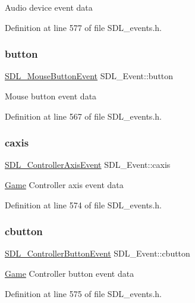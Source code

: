 Audio device event data 

Definition at line 577 of file S\+D\+L\+\_\+events.\+h.

\mbox{\label{union_s_d_l___event_ab6da2fa2687e5f849f270adecc64785f}} 
\subsubsection{\texorpdfstring{button}{button}}
{\footnotesize\ttfamily \mbox{\hyperlink{struct_s_d_l___mouse_button_event}{S\+D\+L\+\_\+\+Mouse\+Button\+Event}} S\+D\+L\+\_\+\+Event\+::button}

Mouse button event data 

Definition at line 567 of file S\+D\+L\+\_\+events.\+h.

\mbox{\label{union_s_d_l___event_aa8f6df0f2716fae56204b12ab4a4c289}} 
\subsubsection{\texorpdfstring{caxis}{caxis}}
{\footnotesize\ttfamily \mbox{\hyperlink{struct_s_d_l___controller_axis_event}{S\+D\+L\+\_\+\+Controller\+Axis\+Event}} S\+D\+L\+\_\+\+Event\+::caxis}

\mbox{\hyperlink{class_game}{Game}} Controller axis event data 

Definition at line 574 of file S\+D\+L\+\_\+events.\+h.

\mbox{\label{union_s_d_l___event_aee2b5671c8dcdb447023715cc21593cb}} 
\subsubsection{\texorpdfstring{cbutton}{cbutton}}
{\footnotesize\ttfamily \mbox{\hyperlink{struct_s_d_l___controller_button_event}{S\+D\+L\+\_\+\+Controller\+Button\+Event}} S\+D\+L\+\_\+\+Event\+::cbutton}

\mbox{\hyperlink{class_game}{Game}} Controller button event data 

Definition at line 575 of file S\+D\+L\+\_\+events.\+h.

